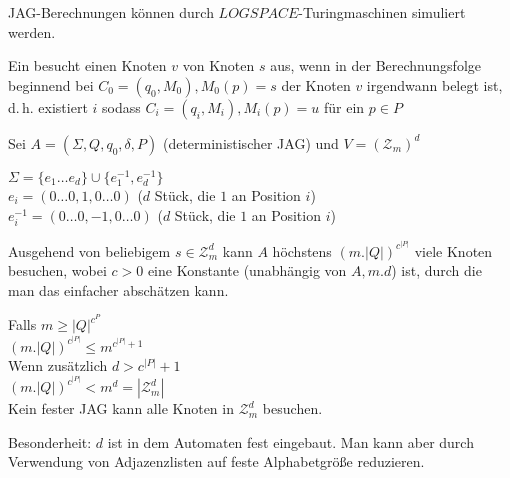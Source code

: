 \begin{satz}

    JAG-Berechnungen können durch $LOGSPACE$-Turingmaschinen simuliert werden.

\end{satz}



\begin{definition}
    
    Ein  besucht einen Knoten $v$ von Knoten $s$ aus, wenn in der Berechnungsfolge beginnend bei $C_0 = (q_0, M_0), M_0(p) = s$ der Knoten $v$ irgendwann belegt ist, d.\,h. existiert $i$ sodass $C_i = (q_i, M_i), M_i(p) = u$ für ein $p \in P$
    
\end{definition}

\begin{satz}
    

    Sei $A = (\Sigma, Q, q_0, \delta, P)$ (deterministischer JAG)
    und $V = (\mathcal{Z}_m)^d$

    $\Sigma = \{ e_1 \dots e_d \} \cup \{ e_1^{-1}, e_d^{-1} \}$
    \\
    $e_i = (0 \dots 0, 1, 0 \dots 0)$ ($d$ Stück, die $1$ an Position $i$)
    \\
    $e_i^{-1} = (0 \dots 0, -1, 0 \dots 0)$ ($d$ Stück, die $1$ an Position $i$)

    Ausgehend von beliebigem $s \in \mathcal{Z}_m^d$ kann $A$ höchstens $(m  . |Q|)^{c^{|P|}}$ viele Knoten besuchen, wobei $c > 0$ eine Konstante (unabhängig von $A, m.d$) ist, durch die man das einfacher abschätzen kann.

\end{satz}

Falls $m \geq |Q|^{c^P}$
\\
$(m  . |Q|)^{c^{|P|}} \leq m^{c^{|P|}+1}$
\\
Wenn zusätzlich $d > c^{|P|} + 1$
\\
$(m  . |Q|)^{c^{|P|}} < m^d = |\mathcal{Z}_m^d|$
\\
Kein fester JAG kann alle Knoten in $\mathcal{Z}_m^d$ besuchen.

Besonderheit: $d$ ist in dem Automaten fest eingebaut. Man kann aber durch Verwendung von Adjazenzlisten auf feste Alphabetgröße reduzieren.



